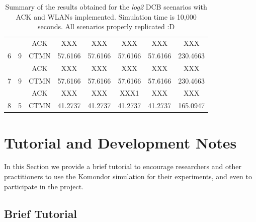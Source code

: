 \documentclass[a4paper]{article}
\begin{document}
\begin{table}[]
\begin{tabular}{|c|c|c|c|c|c|c|c|}
		                                            &                                              & ACK       & XXX    &XXX    & XXX    & XXX    & XXX   \\ \cline{3-8} 
		\multirow{-2}{*}{6}                         & \multirow{-2}{*}{9}                          & CTMN          & 57.6166    & 57.6166    & 57.6166    & 57.6166    & 230.4663   \\ \hline
		                                            &                                              & ACK       & XXX    & XXX    & XXX    & XXX    & XXX   \\ \cline{3-8} 
		\multirow{-2}{*}{7}                         & \multirow{-2}{*}{9}                          & CTMN          & 57.6166    & 57.6166    & 57.6166    & 57.6166    & 230.4663   \\ \hline
		                                            &                                              & ACK       & XXX   & XXX    &XXX1    & XXX   &XXX   \\ \cline{3-8} 
		\multirow{-2}{*}{8}                         & \multirow{-2}{*}{5}                          & CTMN          & 41.2737    & 41.2737    & 41.2737    & 41.2737    & 165.0947   \\ \hline
		\end{tabular}
		\caption{Summary of the results obtained for the \textit{log2} DCB scenarios with ACK and WLANs implemented. Simulation time is 10,000 seconds. All scenarios properly replicated :D}
		\label{table:scenario_4wlans}
	\end{table}
	
\section{Tutorial and Development Notes}
\label{section:tutorial_and_development_notes}
	In this Section we provide a brief tutorial to encourage researchers and other practitioners to use the Komondor simulation for their experiments, and even to participate in the project. 
	
	\subsection{Brief Tutorial}
	\label{section:brief_tutorial}
	
\end{document}
